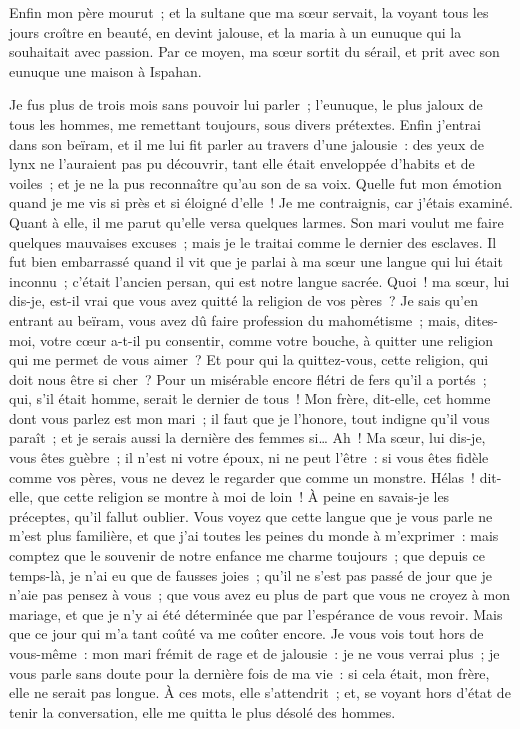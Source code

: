 \documentclass[french,twoside]{book} %
\begin{document}
Enfin mon père mourut ; et la sultane que ma sœur servait, la voyant tous les jours croître en beauté, en devint jalouse, et la maria à un eunuque qui la souhaitait avec passion. Par ce moyen, ma sœur sortit du sérail, et prit avec son eunuque une maison à Ispahan.\par
Je fus plus de trois mois sans pouvoir lui parler ; l’eunuque, le plus jaloux de tous les hommes, me remettant toujours, sous divers prétextes. Enfin j’entrai dans son beïram, et il me lui fit parler au travers d’une jalousie : des yeux de lynx ne l’auraient pas pu découvrir, tant elle était enveloppée d’habits et de voiles ; et je ne la pus reconnaître qu’au son de sa voix. Quelle fut mon émotion quand je me vis si près et si éloigné d’elle ! Je me contraignis, car j’étais examiné. Quant à elle, il me parut qu’elle versa quelques larmes. Son mari voulut me faire quelques mauvaises excuses ; mais je le traitai comme le dernier des esclaves. Il fut bien embarrassé quand il vit que je parlai à ma sœur une langue qui lui était inconnu ; c’était l’ancien persan, qui est notre langue sacrée. Quoi ! ma sœur, lui dis-je, est-il vrai que vous avez quitté la religion de vos pères ? Je sais qu’en entrant au beïram, vous avez dû faire profession du mahométisme ; mais, dites-moi, votre cœur a-t-il pu consentir, comme votre bouche, à quitter une religion qui me permet de vous aimer ? Et pour qui la quittez-vous, cette religion, qui doit nous être si cher ? Pour un misérable encore flétri de fers qu’il a portés ; qui, s’il était homme, serait le dernier de tous ! Mon frère, dit-elle, cet homme dont vous parlez est mon mari ; il faut que je l’honore, tout indigne qu’il vous paraît ; et je serais aussi la dernière des femmes si… Ah ! Ma sœur, lui dis-je, vous êtes guèbre ; il n’est ni votre époux, ni ne peut l’être : si vous êtes fidèle comme vos pères, vous ne devez le regarder que comme un monstre. Hélas ! dit-elle, que cette religion se montre à moi de loin ! À peine en savais-je les préceptes, qu’il fallut oublier. Vous voyez que cette langue que je vous parle ne m’est plus familière, et que j’ai toutes les peines du monde à m’exprimer : mais comptez que le souvenir de notre enfance me charme toujours ; que depuis ce temps-là, je n’ai eu que de fausses joies ; qu’il ne s’est pas passé de jour que je n’aie pas pensez à vous ; que vous avez eu plus de part que vous ne croyez à mon mariage, et que je n’y ai été déterminée que par l’espérance de vous revoir. Mais que ce jour qui m’a tant coûté va me coûter encore. Je vous vois tout hors de vous-même : mon mari frémit de rage et de jalousie : je ne vous verrai plus ; je vous parle sans doute pour la dernière fois de ma vie : si cela était, mon frère, elle ne serait pas longue. À ces mots, elle s’attendrit ; et, se voyant hors d’état de tenir la conversation, elle me quitta le plus désolé des hommes.\par
\end{document}
